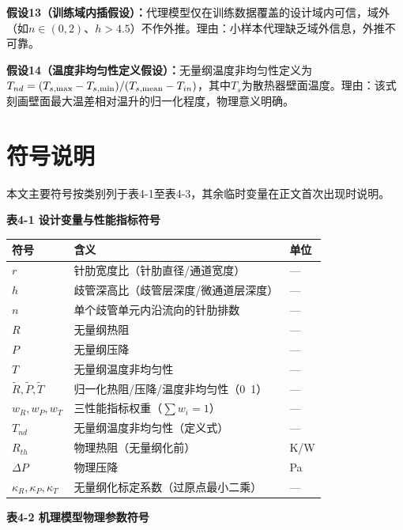 \documentclass[withoutpreface]{cumcmthesis}
\begin{document}
\textbf{假设13（训练域内插假设）：}代理模型仅在训练数据覆盖的设计域内可信，域外（如$n\in(0,2)$、$h>4.5$）不作外推。理由：小样本代理缺乏域外信息，外推不可靠。

\textbf{假设14（温度非均匀性定义假设）：}无量纲温度非均匀性定义为$T_{nd}=(T_{s,\max}-T_{s,\min})/(T_{s,\rm{mean}}-T_{in})$，其中$T_{s}$为散热器壁面温度。理由：该式刻画壁面最大温差相对温升的归一化程度，物理意义明确。

\section{符号说明}
本文主要符号按类别列于表4-1至表4-3，其余临时变量在正文首次出现时说明。

\textbf{表4-1 设计变量与性能指标符号}

\begin{table}[htbp]
\centering
\small
\begin{tabularx}{\textwidth}{XXX}
\toprule
符号 & 含义 & 单位 \\
\midrule
$r$ & 针肋宽度比（针肋直径/通道宽度） & — \\
$h$ & 歧管深高比（歧管层深度/微通道层深度） & — \\
$n$ & 单个歧管单元内沿流向的针肋排数 & — \\
$R$ & 无量纲热阻 & — \\
$P$ & 无量纲压降 & — \\
$T$ & 无量纲温度非均匀性 & — \\
$\tilde{R},\tilde{P},\tilde{T}$ & 归一化热阻/压降/温度非均匀性（0~1） & — \\
$w_R,w_P,w_T$ & 三性能指标权重（$\sum w_i=1$） & — \\
$T_{nd}$ & 无量纲温度非均匀性（定义式） & — \\
$R_{th}$ & 物理热阻（无量纲化前） & K/W \\
$\Delta P$ & 物理压降 & Pa \\
$\kappa_R,\kappa_P,\kappa_T$ & 无量纲化标定系数（过原点最小二乘） & — \\
\bottomrule
\end{tabularx}
\end{table}
\textbf{表4-2 机理模型物理参数符号}
\end{document}
